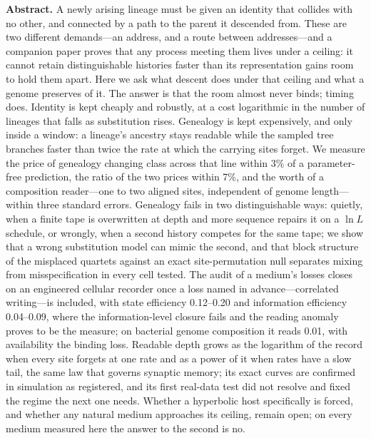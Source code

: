 \documentclass[11pt]{article}
\begin{document}
\vspace{6pt}
\noindent\textbf{Abstract.}
A newly arising lineage must be given an identity that collides with no other, and connected by a path to the parent it descended from. These are two different demands---an address, and a route between addresses---and a companion paper proves that any process meeting them lives under a ceiling: it cannot retain distinguishable histories faster than its representation gains room to hold them apart. Here we ask what descent does under that ceiling and what a genome preserves of it. The answer is that the room almost never binds; timing does. Identity is kept cheaply and robustly, at a cost logarithmic in the number of lineages that falls as substitution rises. Genealogy is kept expensively, and only inside a window: a lineage's ancestry stays readable while the sampled tree branches faster than twice the rate at which the carrying sites forget. We measure the price of genealogy changing class across that line within 3\% of a parameter-free prediction, the ratio of the two prices within 7\%, and the worth of a composition reader---one to two aligned sites, independent of genome length---within three standard errors. Genealogy fails in two distinguishable ways: quietly, when a finite tape is overwritten at depth and more sequence repairs it on a $\ln L$ schedule, or wrongly, when a second history competes for the same tape; we show that a wrong substitution model can mimic the second, and that block structure of the misplaced quartets against an exact site-permutation null separates mixing from misspecification in every cell tested. The audit of a medium's losses closes on an engineered cellular recorder once a loss named in advance---correlated writing---is included, with state efficiency 0.12--0.20 and information efficiency 0.04--0.09, where the information-level closure fails and the reading anomaly proves to be the measure; on bacterial genome composition it reads 0.01, with availability the binding loss. Readable depth grows as the logarithm of the record when every site forgets at one rate and as a power of it when rates have a slow tail, the same law that governs synaptic memory; its exact curves are confirmed in simulation as registered, and its first real-data test did not resolve and fixed the regime the next one needs. Whether a hyperbolic host specifically is forced, and whether any natural medium approaches its ceiling, remain open; on every medium measured here the answer to the second is no.

\vspace{4pt}
\end{document}
